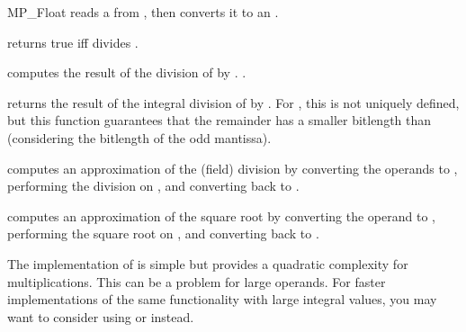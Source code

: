 \begin{ccRefClass} {MP_Float}
{reads a  from , then converts it to an .}

{returns true iff  divides .}

{computes the result of the division of  by .
.}

{returns the result of the integral division of  by .
For , this is not uniquely defined, but this function
guarantees that the remainder has a smaller bitlength than 
(considering the bitlength of the odd mantissa).}

\ccFunction{MP_Float operator%
{returns the remainder of the integral division of \ccc{a} by \ccc{b}.
For \ccc{MP_Float}, this is not uniquely defined, but this function
guarantees that the remainder has a smaller bitlength than \ccc{b}
(considering the bitlength of the odd mantissa).}

\ccFunction{MP_Float gcd(const MP_Float &a, const MP_Float &b);}
{returns the greatest common divisor of \ccc{a} and \ccc{b}.
For \ccc{MP_Float}, this is defined up to a power of 2.}
\ccPrecond{\ccc{a} and \ccc{b} are non zero.}}

{computes an approximation of the (field) division by converting the operands
to , performing the division on , and converting back
to .}

{computes an approximation of the square root by converting the operand to
, performing the square root on , and converting back
to .}


\ccImplementation 
The implementation of  is simple but provides a quadratic
complexity for multiplications.  This can be a problem for large operands.
For faster implementations of the same functionality with large integral
values, you may want to consider using  or  instead.

\end{ccRefClass} 
